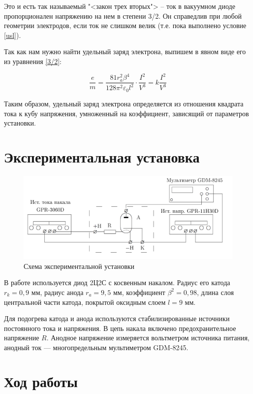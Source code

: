 \documentclass[a4paper, 12pt]{article}
\begin{document}
	Это и есть так называемый "<закон трех вторых"> -- ток в вакуумном диоде пропорционален напряжению на нем в степени 3/2. Он справедлив при любой геометрии электродов, если ток не слишком велик (т.е. пока выполнено условие \eqref{usl}). 
	
	Так как нам нужно найти удельный заряд электрона, выпишем в явном виде его из уравнения \eqref{3/2}:
	
	\begin{equation}\label{e/m}
	 	\frac{e}{m} = \frac{81 r^2_a \beta ^ 4}{128 \pi ^2 \varepsilon_0 l^2} \cdot \frac{I^2}{V^3} = k \frac{I^2}{V^3}
	\end{equation}
	
	Таким образом, удельный заряд электрона определяется из отношения квадрата тока к кубу напряжения, умноженный на коэффициент, зависящий от параметров установки.
	
	\section{Экспериментальная установка}
	\begin{figure}[H]
		\includegraphics[width=15cm]{lab}
		\caption{Схема экспериментальной установки}
	\end{figure}
	
	В работе используется диод 2Ц2С с косвенным накалом. Радиус его катода $ r_k = 0,9 $ мм, радиус анода $ r_a = 9,5  $ мм, коэффициент $ \beta^2 = 0,98 $, длина слоя центральной части катода, покрытой оксидным слоем $ l = 9 $ мм.
	
	Для подогрева катода и анода используются стабилизированные источники постоянного тока и напряжения. В цепь накала включено предохранительное напряжение $ R $. Анодное напряжение измеряется вольтметром источника питания, анодный ток --- многопредельным мультиметром GDM-8245. 
	
	
	\section{Ход работы}
	
\end{document}
